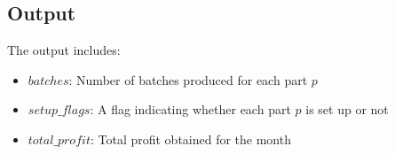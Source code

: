 \documentclass{article}
\begin{document}
\subsection*{Output}
The output includes:
\begin{itemize}
    \item $batches$: Number of batches produced for each part $p$
    \item $setup\_flags$: A flag indicating whether each part $p$ is set up or not
    \item $total\_profit$: Total profit obtained for the month
\end{itemize}
\end{document}
